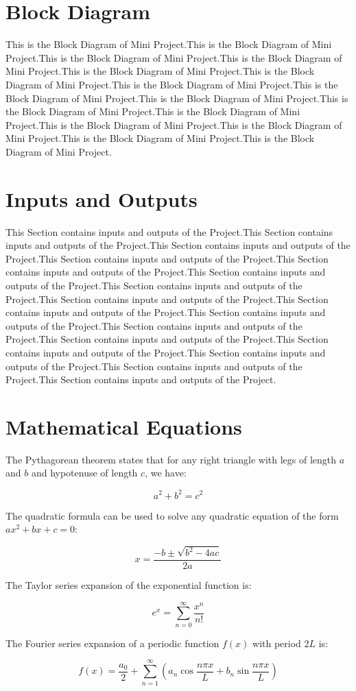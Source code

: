 \documentclass[12pt]{article}
\begin{document}
\section{Block Diagram}
This is the Block Diagram of Mini Project.This is the Block Diagram of Mini Project.This is the Block Diagram of Mini Project.This is the Block Diagram of Mini Project.This is the Block Diagram of Mini Project.This is the Block Diagram of Mini Project.This is the Block Diagram of Mini Project.This is the Block Diagram of Mini Project.This is the Block Diagram of Mini Project.This is the Block Diagram of Mini Project.This is the Block Diagram of Mini Project.This is the Block Diagram of Mini Project.This is the Block Diagram of Mini Project.This is the Block Diagram of Mini Project.This is the Block Diagram of Mini Project.

\section{Inputs and Outputs}
This Section contains inputs and outputs of the Project.This Section contains inputs and outputs of the Project.This Section contains inputs and outputs of the Project.This Section contains inputs and outputs of the Project.This Section contains inputs and outputs of the Project.This Section contains inputs and outputs of the Project.This Section contains inputs and outputs of the Project.This Section contains inputs and outputs of the Project.This Section contains inputs and outputs of the Project.This Section contains inputs and outputs of the Project.This Section contains inputs and outputs of the Project.This Section contains inputs and outputs of the Project.This Section contains inputs and outputs of the Project.This Section contains inputs and outputs of the Project.This Section contains inputs and outputs of the Project.This Section contains inputs and outputs of the Project.

\section{Mathematical Equations} 

The Pythagorean theorem states that for any right triangle with legs of length $a$ and $b$ and hypotenuse of length $c$, we have:

\[a^2 + b^2 = c^2\]

The quadratic formula can be used to solve any quadratic equation of the form $ax^2 + bx + c = 0$:

\[x = \frac{-b \pm \sqrt{b^2 - 4ac}}{2a}\]

The Taylor series expansion of the exponential function is:

\[e^x = \sum_{n=0}^{\infty} \frac{x^n}{n!}\]

The Fourier series expansion of a periodic function $f(x)$ with period $2L$ is:

\[f(x) = \frac{a_0}{2} + \sum_{n=1}^{\infty} \left(a_n \cos \frac{n\pi x}{L} + b_n \sin \frac{n\pi x}{L}\right)\]
\end{document}
